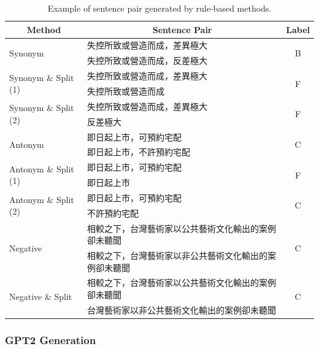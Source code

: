 \documentclass[12pt]{article}
\begin{document}
\begin{CJK*}{UTF8}{bkai}
\begin{spacing}{1.77}
\begin{table}[ht!]
  \centering
  \begin{tabular}{|l|l|c|}
    \hline
    \multicolumn{1}{|c|}{Method} & \multicolumn{1}{c|}{Sentence Pair} & Label \\ \hline
    \multirow{2}{*}{Synonym} & 失控所致或營造而成，差異極大 & \multirow{2}{*}{B} \\ \cline{2-2}
    & 失控所致或營造而成，反差極大 &  \\ \hline
    \multirow{2}{*}{Synonym \& Split (1)} & 失控所致或營造而成，差異極大 & \multirow{2}{*}{F} \\ \cline{2-2}
    & 失控所致或營造而成 &  \\ \hline
    \multirow{2}{*}{Synonym \& Split (2)} & 失控所致或營造而成，差異極大 & \multirow{2}{*}{F} \\ \cline{2-2}
    & 反差極大 &  \\ \hline
    \multirow{2}{*}{Antonym} & 即日起上市，可預約宅配 & \multirow{2}{*}{C} \\ \cline{2-2}
    & 即日起上市，不許預約宅配 &  \\ \hline
    \multirow{2}{*}{Antonym \& Split (1)} & 即日起上市，可預約宅配 & \multirow{2}{*}{F} \\ \cline{2-2}
    & 即日起上市 &  \\ \hline
    \multirow{2}{*}{Antonym \& Split (2)} & 即日起上市，可預約宅配 & \multirow{2}{*}{C} \\ \cline{2-2}
    & 不許預約宅配 &  \\ \hline
    \multirow{2}{*}{Negative} & 相較之下，台灣藝術家以公共藝術文化輸出的案例卻未聽聞 & \multirow{2}{*}{C} \\ \cline{2-2}
    & 相較之下，台灣藝術家以非公共藝術文化輸出的案例卻未聽聞 &  \\ \hline
    \multirow{2}{*}{Negative \& Split} & 相較之下，台灣藝術家以公共藝術文化輸出的案例卻未聽聞 & \multirow{2}{*}{C} \\ \cline{2-2}
    & 台灣藝術家以非公共藝術文化輸出的案例卻未聽聞 &  \\ \hline
  \end{tabular}
  \caption{Example of sentence pair generated by rule-based methods.}
  \label{example:sim_nli_rule_based}
\end{table}

\subsubsection{GPT2 Generation}

\end{spacing}
\end{CJK*}
\end{document}
